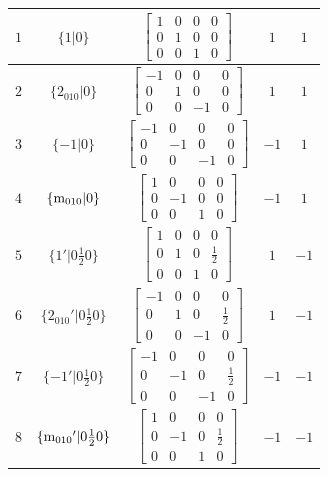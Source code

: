 \documentclass[fleqn,8pt]{jsarticle}
\begin{document}
\begin{longtable}{ccccc}
$ 1 $ & $ \{1|0\} $ & $ \begin{bmatrix} 1 & 0 & 0 & 0 \\ 0 & 1 & 0 & 0 \\ 0 & 0 & 1 & 0 \end{bmatrix} $ & $ 1 $ & $ 1 $ \\ \hline
$ 2 $ & $ \{2{}_{010}|0\} $ & $ \begin{bmatrix} -1 & 0 & 0 & 0 \\ 0 & 1 & 0 & 0 \\ 0 & 0 & -1 & 0 \end{bmatrix} $ & $ 1 $ & $ 1 $ \\ \hline
$ 3 $ & $ \{-1|0\} $ & $ \begin{bmatrix} -1 & 0 & 0 & 0 \\ 0 & -1 & 0 & 0 \\ 0 & 0 & -1 & 0 \end{bmatrix} $ & $ -1 $ & $ 1 $ \\ \hline
$ 4 $ & $ \{{\rm m}_{010}|0\} $ & $ \begin{bmatrix} 1 & 0 & 0 & 0 \\ 0 & -1 & 0 & 0 \\ 0 & 0 & 1 & 0 \end{bmatrix} $ & $ -1 $ & $ 1 $ \\ \hline
$ 5 $ & $ \{1{}'|0 \frac{1}{2} 0\} $ & $ \begin{bmatrix} 1 & 0 & 0 & 0 \\ 0 & 1 & 0 & \frac{1}{2} \\ 0 & 0 & 1 & 0 \end{bmatrix} $ & $ 1 $ & $ -1 $ \\ \hline
$ 6 $ & $ \{2{}_{010}{}'|0 \frac{1}{2} 0\} $ & $ \begin{bmatrix} -1 & 0 & 0 & 0 \\ 0 & 1 & 0 & \frac{1}{2} \\ 0 & 0 & -1 & 0 \end{bmatrix} $ & $ 1 $ & $ -1 $ \\ \hline
$ 7 $ & $ \{-1{}'|0 \frac{1}{2} 0\} $ & $ \begin{bmatrix} -1 & 0 & 0 & 0 \\ 0 & -1 & 0 & \frac{1}{2} \\ 0 & 0 & -1 & 0 \end{bmatrix} $ & $ -1 $ & $ -1 $ \\ \hline
$ 8 $ & $ \{{\rm m}_{010}{}'|0 \frac{1}{2} 0\} $ & $ \begin{bmatrix} 1 & 0 & 0 & 0 \\ 0 & -1 & 0 & \frac{1}{2} \\ 0 & 0 & 1 & 0 \end{bmatrix} $ & $ -1 $ & $ -1 $ \\
\end{longtable}
\end{document}
